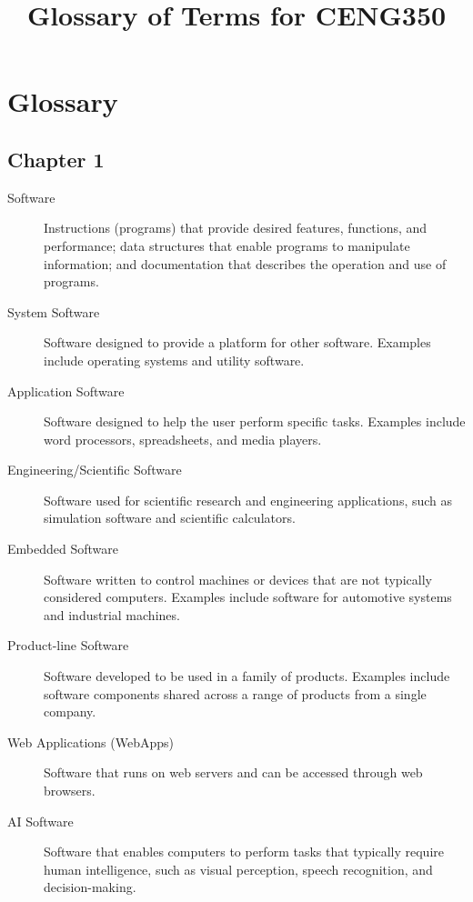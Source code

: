 \documentclass{article}
\title{Glossary of Terms for CENG350}
\begin{document}
\maketitle

\section*{Glossary}
\subsection{Chapter 1}
\begin{description}
  \item[Software] Instructions (programs) that provide desired features, functions, and performance; data structures that enable programs to manipulate information; and documentation that describes the operation and use of programs.
  
  \item[System Software] Software designed to provide a platform for other software. Examples include operating systems and utility software.
  
  \item[Application Software] Software designed to help the user perform specific tasks. Examples include word processors, spreadsheets, and media players.
  
  \item[Engineering/Scientific Software] Software used for scientific research and engineering applications, such as simulation software and scientific calculators.
  
  \item[Embedded Software] Software written to control machines or devices that are not typically considered computers. Examples include software for automotive systems and industrial machines.
  
  \item[Product-line Software] Software developed to be used in a family of products. Examples include software components shared across a range of products from a single company.
  
  \item[Web Applications (WebApps)] Software that runs on web servers and can be accessed through web browsers.
  
  \item[AI Software] Software that enables computers to perform tasks that typically require human intelligence, such as visual perception, speech recognition, and decision-making.
  

\end{description}
\end{document}

